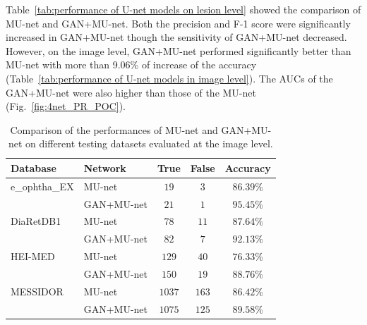 \documentclass{osa-article}
\begin{document}
Table~\ref{tab:performance of U-net models on lesion level} showed the comparison of MU-net and GAN+MU-net. Both the precision and F-1 score were significantly increased in GAN+MU-net though the sensitivity of GAN+MU-net decreased. However, on the image level, GAN+MU-net performed significantly better than MU-net with more than 9.06\% of increase of the accuracy (Table~\ref{tab:performance of U-net models in image level}). The AUCs of the GAN+MU-net were also higher than those of the MU-net (Fig.~\ref{fig:4net_PR_POC}).
\begin{table}[H]
\centering
\caption{Comparison of the performances of MU-net and GAN+MU-net on different testing datasets evaluated at the image level.} 
\small
\setlength\tabcolsep{20pt}
\begin{tabular}{llccc}
\hline
 Database & Network & True & False & Accuracy \\
\hline
e\_ophtha\_EX & MU-net & $19$ & $3$ & $86.39\%$ \\
           & GAN+MU-net & $21$ & $1$ & $\bm{95.45\%}$ \\
\hline
DiaRetDB1 & MU-net & $78$ & $11$ & $87.64\%$  \\
         & GAN+MU-net & $82$ & $7$ & $\bm{92.13\%}$ \\
\hline
HEI-MED & MU-net & $129$ & $40$ & $76.33\%$  \\
      & GAN+MU-net & $150$ & $19$ & $\bm{88.76\%}$ \\
\hline
MESSIDOR & MU-net & $1037$ & $163$ & $86.42\%$ \\
        & GAN+MU-net & $1075$ & $125$ & $\bm{89.58\%}$ \\
\hline
\end{tabular}
\label{tab:comparison of performances on different training Set on image level}
\end{table}
\end{document}
